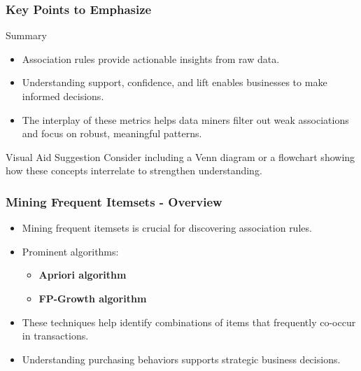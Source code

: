 \documentclass[aspectratio=169]{beamer}
\begin{document}
\begin{frame}[fragile]
    \frametitle{Key Points to Emphasize}
    \begin{block}{Summary}
        \begin{itemize}
            \item Association rules provide actionable insights from raw data.
            \item Understanding support, confidence, and lift enables businesses to make informed decisions.
            \item The interplay of these metrics helps data miners filter out weak associations and focus on robust, meaningful patterns.
        \end{itemize}
    \end{block}
    \begin{exampleblock}{Visual Aid Suggestion}
        Consider including a Venn diagram or a flowchart showing how these concepts interrelate to strengthen understanding.
    \end{exampleblock}
\end{frame}

\begin{frame}[fragile]
    \frametitle{Mining Frequent Itemsets - Overview}
    \begin{itemize}
        \item Mining frequent itemsets is crucial for discovering association rules.
        \item Prominent algorithms:
        \begin{itemize}
            \item \textbf{Apriori algorithm}
            \item \textbf{FP-Growth algorithm}
        \end{itemize}
        \item These techniques help identify combinations of items that frequently co-occur in transactions.
        \item Understanding purchasing behaviors supports strategic business decisions.
    \end{itemize}
\end{frame}
\end{document}
